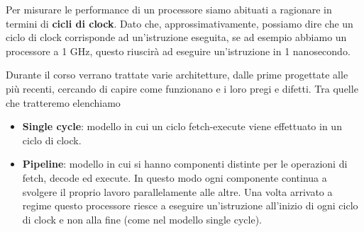 Per misurare le performance di un processore siamo abituati a ragionare in termini di
\textbf{cicli di clock}. Dato che, approssimativamente, possiamo dire che un ciclo di clock
corrisponde ad un'istruzione eseguita, se ad esempio abbiamo un processore a 1 GHz, questo riuscirà
ad eseguire un'istruzione in 1 nanosecondo.

Durante il corso verrano trattate varie architetture, dalle prime progettate alle più recenti,
cercando di capire come funzionano e i loro pregi e difetti. Tra quelle che tratteremo elenchiamo
\begin{itemize}
	\item \textbf{Single cycle}: modello in cui un ciclo fetch-execute viene effettuato in un ciclo
	      di clock.
	\item \textbf{Pipeline}: modello in cui si hanno componenti distinte per le operazioni di fetch,
	      decode ed execute. In questo modo ogni componente continua a svolgere il proprio lavoro
	      parallelamente alle altre. Una volta arrivato a regime questo processore riesce a
	      eseguire un'istruzione all'inizio di ogni ciclo di clock e non alla fine (come nel
	      modello single cycle).
\end{itemize}